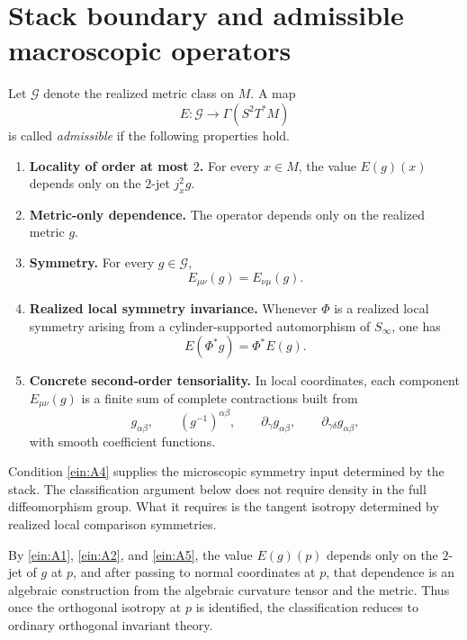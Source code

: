 \section{Stack boundary and admissible macroscopic operators}
\label{sec:einstein-boundary}
\begin{definition}
	\label{def:admissible-operator}
	Let \(\mathcal G\) denote the realized metric class on \(M\).
	A map
	\[
		E:\mathcal G\to \Gamma(S^2T^*M)
	\]
	is called \emph{admissible} if the following properties hold.
	\begin{enumerate}[label=\textup{(A\arabic*)}]
		\item \label{ein:A1}
		      \textbf{Locality of order at most \(2\).}
		      For every \(x\in M\), the value \(E(g)(x)\) depends only on the
		      \(2\)-jet \(j_x^2g\).
		\item \label{ein:A2}
		      \textbf{Metric-only dependence.}
		      The operator depends only on the realized metric \(g\).
		\item \label{ein:A3}
		      \textbf{Symmetry.}
		      For every \(g\in\mathcal G\),
		      \[
			      E_{\mu\nu}(g)=E_{\nu\mu}(g).
		      \]
		\item \label{ein:A4}
		      \textbf{Realized local symmetry invariance.}
		      Whenever \(\Phi\) is a realized local symmetry arising from a
		      cylinder-supported automorphism of \(S_\infty\), one has
		      \[
			      E(\Phi^*g)=\Phi^*E(g).
		      \]
		\item \label{ein:A5}
		      \textbf{Concrete second-order tensoriality.}
		      In local coordinates, each component \(E_{\mu\nu}(g)\) is a finite sum
		      of complete contractions built from
		      \[
			      g_{\alpha\beta},
			      \qquad
			      (g^{-1})^{\alpha\beta},
			      \qquad
			      \partial_\gamma g_{\alpha\beta},
			      \qquad
			      \partial_{\gamma\delta} g_{\alpha\beta},
		      \]
		      with smooth coefficient functions.
	\end{enumerate}
\end{definition}
\begin{remark}
	Condition \textup{\ref{ein:A4}} supplies the microscopic symmetry input
	determined by the stack.
	The classification argument below does not require density in the full
	diffeomorphism group.
	What it requires is the tangent isotropy determined by realized local
	comparison symmetries.
\end{remark}
\begin{remark}
	By \textup{\ref{ein:A1}}, \textup{\ref{ein:A2}}, and
	\textup{\ref{ein:A5}}, the value \(E(g)(p)\) depends only on the
	\(2\)-jet of \(g\) at \(p\), and after passing to normal coordinates at
	\(p\), that dependence is an algebraic construction from the algebraic
	curvature tensor and the metric.
	Thus once the orthogonal isotropy at \(p\) is identified, the
	classification reduces to ordinary orthogonal invariant theory.
\end{remark}
